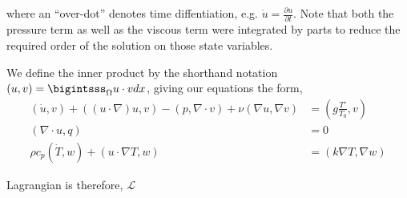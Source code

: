 \documentclass{article}
\begin{document}
where an ``over-dot'' denotes time diffentiation, e.g. $\dot u =
\frac{\partial u}{\partial t}$. Note that both the pressure term as well
as the viscous term were integrated by parts to reduce the required
order of the solution on those state variables.  

We define the inner product by the shorthand notation $(u,v) =
\bigintsss_\Omega u\cdot v dx $, giving our equations the form,  
\begin{align}
 (\dot u,v) + ((u \cdot \nabla) u, v) - (p,\nabla \cdot v) + \nu (\nabla
 u, \nabla v) &= (g \frac{T'}{T_0},v) \\
 (\nabla \cdot u, q) &= 0 \\
  \rho c_p (\dot T,w) + (u \cdot \nabla T,w) &= (k \nabla T,\nabla w)
\end{align}


Lagrangian is therefore,
$\mathcal{L}$
\end{document}
